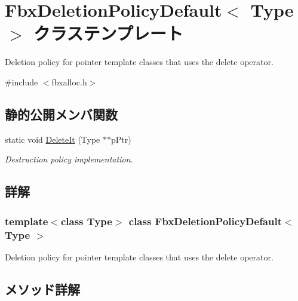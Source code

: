 \hypertarget{class_fbx_deletion_policy_default}{}\section{Fbx\+Deletion\+Policy\+Default$<$ Type $>$ クラステンプレート}
\label{class_fbx_deletion_policy_default}


Deletion policy for pointer template classes that uses the delete operator.  




{\ttfamily \#include $<$fbxalloc.\+h$>$}

\subsection*{静的公開メンバ関数}
\begin{DoxyCompactItemize}
\item 
static void \hyperlink{class_fbx_deletion_policy_default_a6f1fb89b306b4b1bf88d5be8aaf1d83e}{Delete\+It} (Type $\ast$$\ast$p\+Ptr)
\begin{DoxyCompactList}\small\item\em Destruction policy implementation. \end{DoxyCompactList}\end{DoxyCompactItemize}


\subsection{詳解}
\subsubsection*{template$<$class Type$>$\newline
class Fbx\+Deletion\+Policy\+Default$<$ Type $>$}

Deletion policy for pointer template classes that uses the delete operator. 

\subsection{メソッド詳解}
\mbox{\label{class_fbx_deletion_policy_default_a6f1fb89b306b4b1bf88d5be8aaf1d83e}} 
